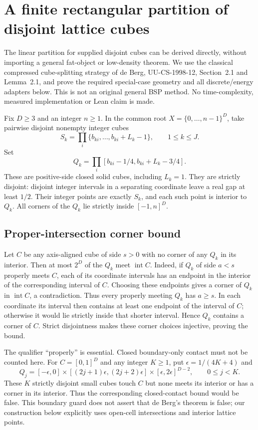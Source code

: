 \section{A finite rectangular partition of disjoint lattice cubes}
\label{sec:explicit-cube-partition}
The linear partition for supplied disjoint cubes can be derived directly,
without importing a general fat-object or low-density theorem. We use the
classical compressed cube-splitting strategy of de Berg, UU-CS-1998-12,
Section~2.1 and Lemma~2.1, and prove the required special-case geometry and
all discrete/energy adapters below. This is not an original general BSP
method. No time-complexity, measured implementation or Lean claim is made.

Fix $D\geq3$ and an integer $n\geq1$. In the common root
$X=\{0,\ldots,n-1\}^D$, take pairwise disjoint nonempty integer cubes
\[
 S_k=\prod_i\{b_{ki},\ldots,b_{ki}+L_k-1\},\qquad 1\leq k\leq J.
\]
Set
\[
 Q_k=\prod_i[b_{ki}-1/4,b_{ki}+L_k-3/4].
\]
These are positive-side closed solid cubes, including $L_k=1$. They are
strictly disjoint: disjoint integer intervals in a separating coordinate
leave a real gap at least $1/2$. Their integer points are exactly $S_k$,
and each such point is interior to $Q_k$. All corners of the $Q_k$ lie
strictly inside $[-1,n]^D$.

\subsection{Proper-intersection corner bound}
Let $C$ be any axis-aligned cube of side $s>0$ with no corner of any $Q_k$
in its interior. Then at most $2^D$ of the $Q_k$ meet $\operatorname{int}C$.
Indeed, if $Q_k$ of side $a<s$ properly meets $C$, each of its coordinate
intervals has an endpoint in the interior of the corresponding interval
of $C$. Choosing these endpoints gives a corner of $Q_k$ in
$\operatorname{int}C$, a contradiction. Thus every properly meeting $Q_k$
has $a\geq s$. In each coordinate its interval then contains at least
one endpoint of the interval of $C$; otherwise it would lie strictly
inside that shorter interval. Hence $Q_k$ contains a corner of $C$.
Strict disjointness makes these corner choices injective, proving the bound.

The qualifier ``properly'' is essential. Closed boundary-only contact
must not be counted here. For $C=[0,1]^D$ and any integer $K\geq1$, put
$\epsilon=1/(4K+4)$ and
\[
 Q_j=[-\epsilon,0]\times[(2j+1)\epsilon,(2j+2)\epsilon]
       \times[\epsilon,2\epsilon]^{D-2},\qquad0\leq j<K.
\]
These $K$ strictly disjoint small cubes touch $C$ but none meets its
interior or has a corner in its interior. Thus the corresponding
closed-contact bound would be false. This boundary guard does not assert
that de Berg's theorem is false; our construction below explicitly uses
open-cell intersections and interior lattice points.

